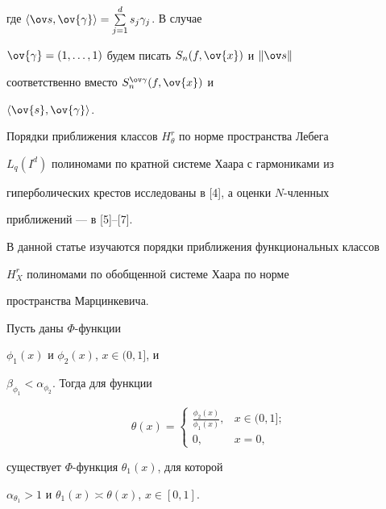 где $\la\ov s,\ov{\gamma}\ra=\sum\limits_{j=1}^{d}s_{j}\gamma_{j}$.  В случае 


$\ov{\gamma}=(1,\dotsc,1)$ будем писать $S_{n}(f,\ov{x})$ и $\|\ov s\|$ 


соответственно вместо $S_{n}^{\ov\gamma}(f,\ov{x})$ и 


$\la\ov{s},\ov{\gamma}\ra$.





Порядки приближения классов $H_{\theta}^{r}$ по норме пространства Лебега 


$L_{q}(I^{d})$ полиномами по кратной системе Хаара с гармониками из 


гиперболических крестов исследованы в [4], а оценки $N$-членных 


приближений --- в [5]--[7]. 





В данной статье изучаются порядки приближения функциональных классов 


$H_{X}^{r}$ полиномами по обобщенной системе Хаара по норме 


пространства Марцинкевича.








\begin{alem}


Пусть даны $\Phi$-функции 


$\phi_{1}(x)$ и $\phi_{2}(x)$, $x\in (0,1]$, и 


$\beta_{\phi_{1}}<\alpha_{\phi_{2}}$. Тогда для функции


$$


\theta(x)=


\begin{cases}


\frac{\phi_{2}(x)}{\phi_{1}(x)}, & x\in(0,1]; \\


0, & x=0,


\end{cases}


$$


существует $\Phi$-функция $\theta_{1}(x)$, для которой 


$\alpha_{\theta_{1}}>1$ и $\theta_{1}(x)\asymp\theta(x)$, $x\in[0,1]$.


\end{alem}








